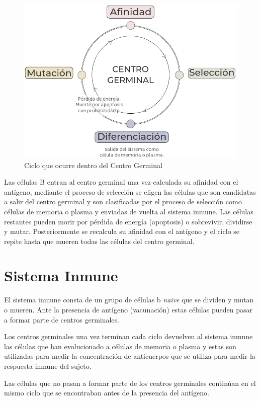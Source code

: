 \begin{figure}[H] %
    \centering
    \includegraphics[width=1\textwidth]{Graphics/gc.png}
    \caption{Ciclo que ocurre dentro del Centro Germinal}
    \label{fig:cg}
\end{figure}

Las células B entran al centro germinal una vez calculada su afinidad con el antígeno, mediante el proceso de selección se eligen las células que son candidatas a salir del centro germinal y son clasificadas por el proceso de selección como células de memoria o plasma y enviadas de vuelta al sistema inmune. Las células restantes pueden morir por pérdida de energía (apoptosis) o sobrevivir, dividirse y mutar. Posteriormente se recalcula su afinidad con el antígeno y el ciclo se repite hasta que mueren todas las células del centro germinal.

\section{Sistema Inmune}

El sistema inmune consta de un grupo de células b \textit{naive} que se dividen y mutan o mueren. Ante la presencia de antígeno (vacunación) estas células pueden pasar a formar parte de centros germinales. 

Los centros germinales una vez terminan cada ciclo devuelven al sistema inmune las células que han evolucionado a células de memoria o plasma y estas son utilizadas para medir la concentración de anticuerpos que se utiliza para medir la respuesta inmune del sujeto.

Las células que no pasan a formar parte de los centros germinales continúan en el mismo ciclo que se encontraban antes de la presencia del antígeno.

